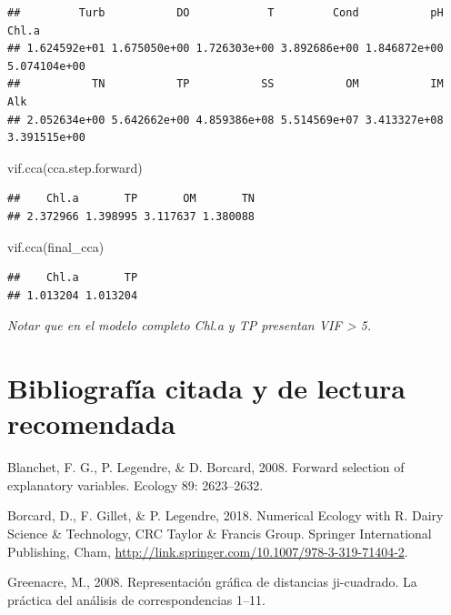 \documentclass[
]{book}
\newenvironment{Shaded}{\begin{snugshade}}{\end{snugshade}}
\newcommand{\FunctionTok}[1]{\textcolor[rgb]{0.00,0.00,0.00}{#1}}
\newcommand{\NormalTok}[1]{#1}
\begin{document}
\begin{verbatim}
##         Turb           DO            T         Cond           pH        Chl.a 
## 1.624592e+01 1.675050e+00 1.726303e+00 3.892686e+00 1.846872e+00 5.074104e+00 
##           TN           TP           SS           OM           IM          Alk 
## 2.052634e+00 5.642662e+00 4.859386e+08 5.514569e+07 3.413327e+08 3.391515e+00
\end{verbatim}

\begin{Shaded}
\begin{Highlighting}[]
\FunctionTok{vif.cca}\NormalTok{(cca.step.forward)}
\end{Highlighting}
\end{Shaded}

\begin{verbatim}
##    Chl.a       TP       OM       TN 
## 2.372966 1.398995 3.117637 1.380088
\end{verbatim}

\begin{Shaded}
\begin{Highlighting}[]
\FunctionTok{vif.cca}\NormalTok{(final\_cca)}
\end{Highlighting}
\end{Shaded}

\begin{verbatim}
##    Chl.a       TP 
## 1.013204 1.013204
\end{verbatim}

\emph{Notar que en el modelo completo Chl.a y TP presentan VIF \textgreater{} 5.}

\hypertarget{bibliografuxeda-citada-y-de-lectura-recomendada}{%
\section{Bibliografía citada y de lectura recomendada}\label{bibliografuxeda-citada-y-de-lectura-recomendada}}

Blanchet, F. G., P. Legendre, \& D. Borcard, 2008. Forward selection of explanatory variables. Ecology 89: 2623--2632.

Borcard, D., F. Gillet, \& P. Legendre, 2018. Numerical Ecology with R. Dairy Science \& Technology, CRC Taylor \& Francis Group. Springer International Publishing, Cham, \url{http://link.springer.com/10.1007/978-3-319-71404-2}.

Greenacre, M., 2008. Representación gráfica de distancias ji-cuadrado. La práctica del análisis de correspondencias 1--11.
\end{document}

